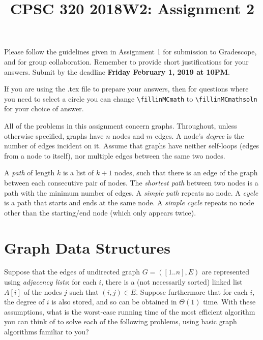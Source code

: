 \documentclass[11pt]{article}
\date{}
\title{CPSC 320 2018W2: Assignment 2}
\newcommand{\fillinMCmath}[1]{\begin{tikzpicture}\draw circle [radius=0.5em];\end{tikzpicture}\ #1}
\newcommand{\fillinMCmathsoln}[1]{\begin{tikzpicture}\draw[black, fill=blue] circle [radius=0.5em];\end{tikzpicture}\ #1}
\begin{document}
\maketitle
\vspace{-.5in}

Please follow the guidelines given in Assignment 1 for submission to
Gradescope, and for group collaboration. Remember to provide short
justifications for your answers. Submit by the deadline \textbf{Friday
February 1, 2019 at 10PM}.

If you are using the .tex file to prepare your answers, then for
questions where you need to select a circle you can
change \verb~\fillinMCmath~ to \verb~\fillinMCmathsoln~ for your choice of answer.

All of the problems in this assignment concern graphs. Throughout,
unless otherwise specified, graphs have $n$ nodes and $m$ edges.
A node's \emph{degree} is the number of edges incident on it. 
Assume that graphs have neither self-loops (edges from a node to itself), nor
multiple edges between the same two nodes.

A \emph{path} of length $k$ is a list of $k+1$ nodes, such that there is an edge
of the graph between each consecutive pair of nodes.  The \emph{shortest path}
between two nodes is a path with the minimum number
of edges. A \emph{simple path} repeats no node. A \emph{cycle} is a path that
starts and ends at the same node. A \emph{simple cycle} repeats no node
other than the starting/end node (which only appears twice).  

\medskip
\section{Graph Data Structures}
\label{sec-1}
Suppose that the edges of undirected graph $G = ([1..n],E)$ are
represented using \emph{adjacency lists}: for each $i$, there is a (not
necessarily sorted) linked list $A[i]$ of the nodes $j$ such that
$(i,j) \in E$.  Suppose furthermore that for each $i$, the degree of
$i$ is also stored, and so can be obtained in $\Theta(1)$ time.  With
these assumptions, what is the worst-case running time of the most
efficient algorithm you can think of to solve each of the following problems,
using basic graph algorithms familiar to you?
\end{document}
